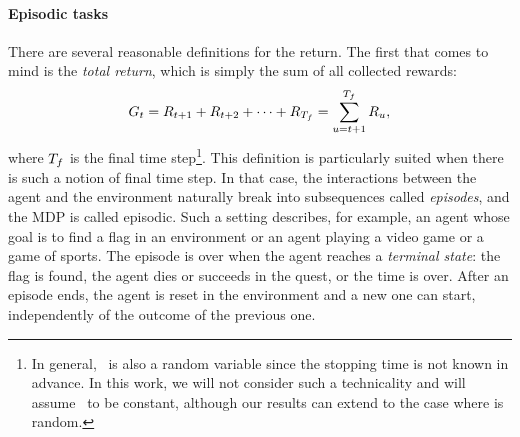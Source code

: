 				\paragraph{Episodic tasks} There are several reasonable definitions for the return. The first that comes to mind is the\emph{ total return}, which is simply the sum of all collected rewards:
				\begin{equation}
					G_t = R_{t+1} + R_{t+2}  + \cdots + R_{{T_f}} = \sum_{u=t+1}^{{T_f}} R_u, \label{eq:total return}
				\end{equation}
				where ${T_f}$ is the final time step\footnote{In general, \Tf~is also a random variable since the stopping time is not known in advance. In this work, we will not consider such a technicality and will assume \Tf~to be constant, although our results can extend to the case where \Tf is random.}. This definition is particularly suited when there is such a notion of final time step. In that case, the interactions between the agent and the environment naturally break into subsequences called\emph{ episodes}, and the MDP is called episodic. Such a setting describes, for example, an agent whose goal is to find a flag in an environment or an agent playing a video game or a game of sports. The episode is over when the agent reaches a\emph{ terminal state}: the flag is found, the agent dies or succeeds in the quest, or the time is over. After an episode ends, the agent is reset in the environment and a new one can start, independently of the outcome of the previous one.
